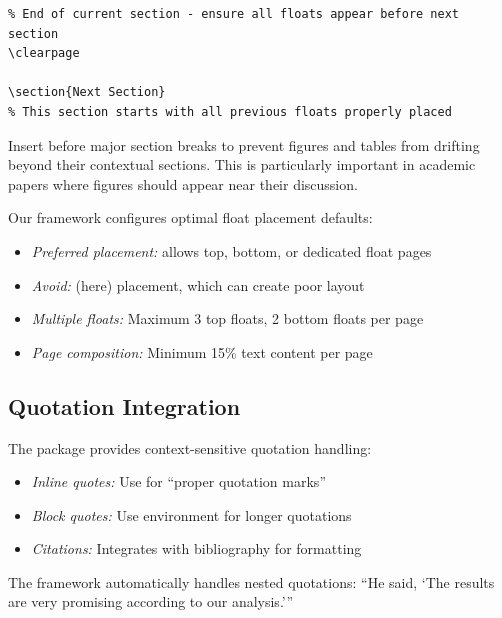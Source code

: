 \documentclass[11pt]{article}
\begin{document}
\begin{verbatim}
% End of current section - ensure all floats appear before next section
\clearpage

\section{Next Section}
% This section starts with all previous floats properly placed
\end{verbatim}

 Insert  before major section breaks to prevent figures and tables from drifting beyond their contextual sections. This is particularly important in academic papers where figures should appear near their discussion.

 Our framework configures optimal float placement defaults:
\begin{itemize}
\item \emph{Preferred placement:} \code{[tbp]} allows top, bottom, or dedicated float pages
\item \emph{Avoid:} \code{[h]} (here) placement, which can create poor layout
\item \emph{Multiple floats:} Maximum 3 top floats, 2 bottom floats per page
\item \emph{Page composition:} Minimum 15\% text content per page
\end{itemize}

\subsection{Quotation Integration}

The  package provides context-sensitive quotation handling:

\begin{itemize}
\item \emph{Inline quotes:} Use  for \enquote{proper quotation marks}
\item \emph{Block quotes:} Use  environment for longer quotations
\item \emph{Citations:} Integrates with bibliography for  formatting
\end{itemize}

 The framework automatically handles nested quotations: \enquote{He said, \enquote{The results are very promising according to our analysis.}}
\end{document}
